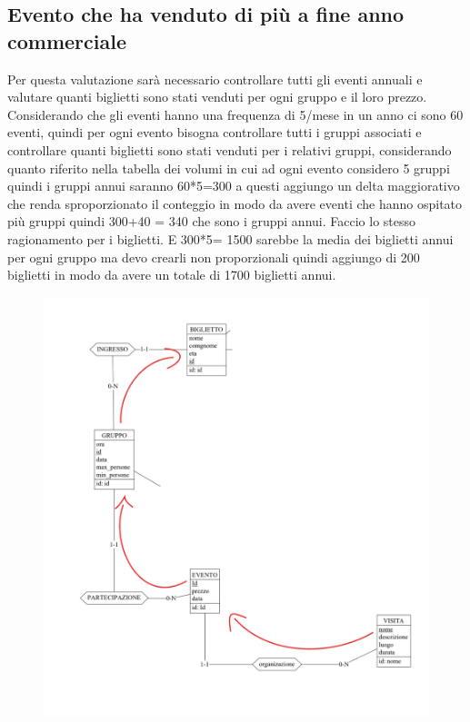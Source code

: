 \documentclass[a4paper,12pt]{report}
\begin{document}
\subsection{Evento che ha venduto di più a fine anno commerciale \label{op:Vendite_annuali}}
Per questa valutazione sarà necessario controllare tutti gli eventi annuali e
valutare quanti biglietti sono stati venduti per ogni gruppo e il loro prezzo.
Considerando che gli eventi hanno una frequenza di 5/mese in un anno ci sono 60
eventi, quindi per ogni evento bisogna controllare tutti i gruppi associati e
controllare quanti biglietti sono stati venduti per i relativi gruppi,
considerando quanto riferito nella tabella dei volumi in cui ad ogni evento
considero 5 gruppi quindi i gruppi annui saranno 60*5=300 a questi aggiungo un
delta maggiorativo che renda sproporzionato il conteggio in modo da avere
eventi che hanno ospitato più gruppi quindi 300+40 = 340 che sono i gruppi
annui. Faccio lo stesso ragionamento per i biglietti. E 300*5= 1500  sarebbe la
media dei biglietti annui per ogni gruppo ma devo crearli non proporzionali
quindi aggiungo di 200 biglietti in modo da avere un totale di 1700 biglietti
annui.

\begin{figure}[H]
	\centering
	\includegraphics[width=0.9\linewidth]{schemiAccesso/venditaAnnuale.png}
\end{figure}
\end{document}
